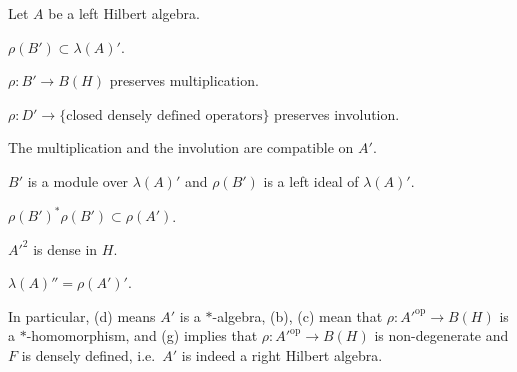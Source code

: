\documentclass{../../small}
\begin{document}
\begin{prop}
Let $A$ be a left Hilbert algebra.
\begin{parts}
\item $\rho(B')\subset\lambda(A)'$.
\item $\rho:B'\to B(H)$ preserves multiplication.
\item $\rho:D'\to\{\text{closed densely defined operators}\}$ preserves involution.
\item The multiplication and the involution are compatible on $A'$.
\item $B'$ is a module over $\lambda(A)'$ and $\rho(B')$ is a left ideal of $\lambda(A)'$.
\item $\rho(B')^*\rho(B')\subset\rho(A')$.
\item $A'^2$ is dense in $H$.
\item $\lambda(A)''=\rho(A')'$.
\end{parts}
In particular, (d) means $A'$ is a $*$-algebra, (b), (c) mean that $\rho:A'^{\operatorname{op}}\to B(H)$ is a $*$-homomorphism, and (g) implies that $\rho:A'^{\operatorname{op}}\to B(H)$ is non-degenerate and $F$ is densely defined, i.e.~$A'$ is indeed a right Hilbert algebra.
\end{prop}
\end{document}
